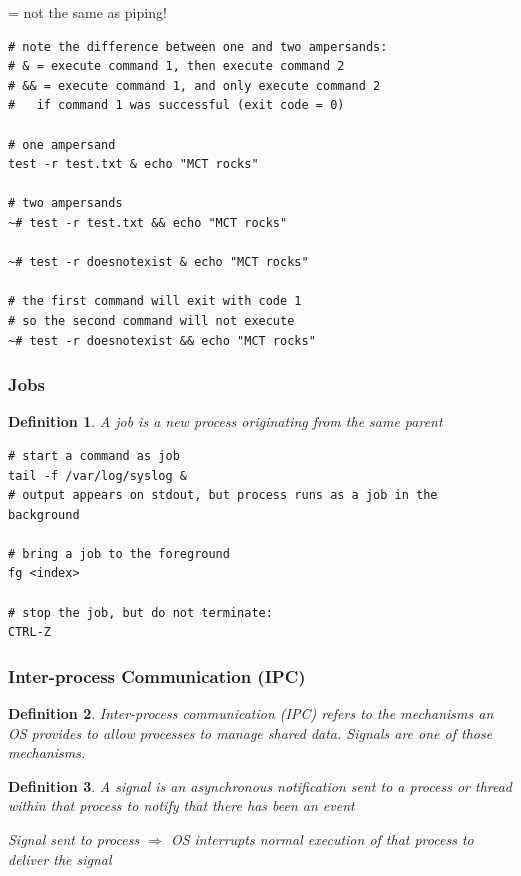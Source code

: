 \documentclass{article}
\newtheorem{theorem}{Definition}[section]
\begin{document}
= not the same as piping!

\begin{verbatim}
# note the difference between one and two ampersands:
# & = execute command 1, then execute command 2
# && = execute command 1, and only execute command 2 
#   if command 1 was successful (exit code = 0)

# one ampersand
test -r test.txt & echo "MCT rocks"

# two ampersands
~# test -r test.txt && echo "MCT rocks"

~# test -r doesnotexist & echo "MCT rocks"

# the first command will exit with code 1
# so the second command will not execute
~# test -r doesnotexist && echo "MCT rocks"
\end{verbatim}

\subsubsection{Jobs}

\begin{theorem}
    A job is a new process originating from the same parent
\end{theorem}

\begin{verbatim}
# start a command as job
tail -f /var/log/syslog &
# output appears on stdout, but process runs as a job in the background

# bring a job to the foreground
fg <index>

# stop the job, but do not terminate:
CTRL-Z
\end{verbatim}


\subsubsection{Inter-process Communication (IPC)}

\begin{theorem}
    Inter-process communication (IPC) refers to the mechanisms an OS provides
    to allow processes to manage shared data. Signals are one of those mechanisms.
\end{theorem}

\begin{theorem}
    A signal is an asynchronous notification sent to a process or thread within that process
    to notify that there has been an event
    
    Signal sent to process $\Rightarrow$ OS interrupts normal execution of that process to deliver the signal
\end{theorem}
\end{document}
